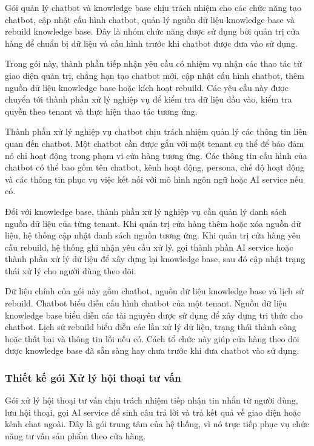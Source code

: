 \documentclass[../DoAn.tex]{subfiles}
\begin{document}
Gói quản lý chatbot và knowledge base chịu trách nhiệm cho các chức năng tạo chatbot, cập nhật cấu hình chatbot, quản lý nguồn dữ liệu knowledge base và rebuild knowledge base. Đây là nhóm chức năng được sử dụng bởi quản trị cửa hàng để chuẩn bị dữ liệu và cấu hình trước khi chatbot được đưa vào sử dụng.

Trong gói này, thành phần tiếp nhận yêu cầu có nhiệm vụ nhận các thao tác từ giao diện quản trị, chẳng hạn tạo chatbot mới, cập nhật cấu hình chatbot, thêm nguồn dữ liệu knowledge base hoặc kích hoạt rebuild. Các yêu cầu này được chuyển tới thành phần xử lý nghiệp vụ để kiểm tra dữ liệu đầu vào, kiểm tra quyền theo tenant và thực hiện thao tác tương ứng.

Thành phần xử lý nghiệp vụ chatbot chịu trách nhiệm quản lý các thông tin liên quan đến chatbot. Một chatbot cần được gắn với một tenant cụ thể để bảo đảm nó chỉ hoạt động trong phạm vi cửa hàng tương ứng. Các thông tin cấu hình của chatbot có thể bao gồm tên chatbot, kênh hoạt động, persona, chế độ hoạt động và các thông tin phục vụ việc kết nối với mô hình ngôn ngữ hoặc AI service nếu có.

Đối với knowledge base, thành phần xử lý nghiệp vụ cần quản lý danh sách nguồn dữ liệu của từng tenant. Khi quản trị cửa hàng thêm hoặc xóa nguồn dữ liệu, hệ thống cập nhật danh sách nguồn tương ứng. Khi quản trị cửa hàng yêu cầu rebuild, hệ thống ghi nhận yêu cầu xử lý, gọi thành phần AI service hoặc thành phần xử lý dữ liệu để xây dựng lại knowledge base, sau đó cập nhật trạng thái xử lý cho người dùng theo dõi.

Dữ liệu chính của gói này gồm chatbot, nguồn dữ liệu knowledge base và lịch sử rebuild. Chatbot biểu diễn cấu hình chatbot của một tenant. Nguồn dữ liệu knowledge base biểu diễn các tài nguyên được sử dụng để xây dựng tri thức cho chatbot. Lịch sử rebuild biểu diễn các lần xử lý dữ liệu, trạng thái thành công hoặc thất bại và thông tin lỗi nếu có. Cách tổ chức này giúp cửa hàng theo dõi được knowledge base đã sẵn sàng hay chưa trước khi đưa chatbot vào sử dụng.

\subsubsection{Thiết kế gói Xử lý hội thoại tư vấn}

Gói xử lý hội thoại tư vấn chịu trách nhiệm tiếp nhận tin nhắn từ người dùng, lưu hội thoại, gọi AI service để sinh câu trả lời và trả kết quả về giao diện hoặc kênh chat ngoài. Đây là gói trung tâm của hệ thống, vì nó trực tiếp phục vụ chức năng tư vấn sản phẩm theo cửa hàng.
\end{document}
